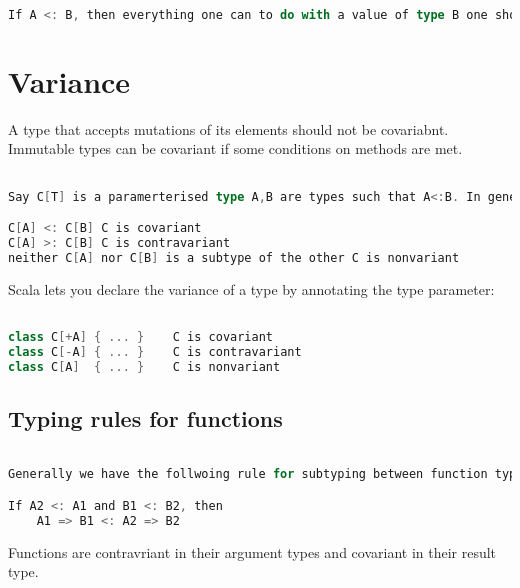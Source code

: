 \documentclass[10pt, a4paper]{report}
\begin{document}
\begin{lstlisting}[language=scala]

If A <: B, then everything one can to do with a value of type B one should be able to do with a value of type A

\end{lstlisting}

\section{Variance}

A type that accepts mutations of its elements should not be covariabnt. Immutable types can be covariant if some conditions on methods are met.

\begin{lstlisting}[language=scala]

Say C[T] is a paramerterised type A,B are types such that A<:B. In general there are theree possible relationshipds between C[A] and C[B].

C[A] <: C[B] C is covariant
C[A] >: C[B] C is contravariant
neither C[A] nor C[B] is a subtype of the other C is nonvariant

\end{lstlisting}

Scala lets you declare the variance of a type by annotating the type parameter:

\begin{lstlisting}[language=scala]

class C[+A] { ... }    C is covariant
class C[-A] { ... }    C is contravariant
class C[A]  { ... }    C is nonvariant

\end{lstlisting}

\subsection{Typing rules for functions}

\begin{lstlisting}[language=scala]

Generally we have the follwoing rule for subtyping between function types

If A2 <: A1 and B1 <: B2, then 
	A1 => B1 <: A2 => B2

\end{lstlisting}

Functions are contravriant in their argument types and covariant in their result type. 
\end{document}
